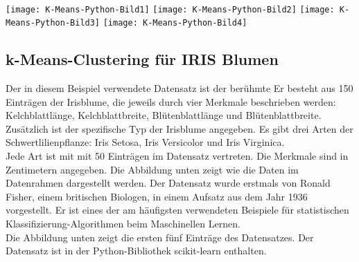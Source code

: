 \documentclass[12pt]{article}
\begin{document}
{\color{red}{***********************************************************************\\ 
Ab hier bis Ende der Section sind die Folien der Vorlesung ML  zu nutzen und diese sind in Latex umzusetzen...\\
************************************************************************}}\\[0.2cm]


\begin{center}
\hspace*{-1.0cm}   
\texttt{[image: K-Means-Python-Bild1]}
\hspace*{-1.0cm}   
\texttt{[image: K-Means-Python-Bild2]}
\hspace*{-1.0cm} 
\texttt{[image: K-Means-Python-Bild3]}
\hspace*{-1.0cm} 
\texttt{[image: K-Means-Python-Bild4]}
\end{center}

\subsection{k-Means-Clustering für IRIS Blumen}


Der in diesem Beispiel verwendete Datensatz ist der berühmte {\color{blue}{IRIS-Blumen Datensatz}}  Er besteht aus 150 Einträgen der Irisblume, die jeweils durch vier Merkmale beschrieben werden: Kelchblattlänge, Kelchblattbreite, Blütenblattlänge und
Blütenblattbreite. \\[0.2cm]
Zusätzlich ist der spezifische Typ der Irisblume angegeben. Es gibt drei Arten
der Schwertlilienpflanze: Iris Setosa, Iris Versicolor und Iris Virginica.\\
Jede Art ist mit mit 50 Einträgen im Datensatz vertreten. Die Merkmale sind in Zentimetern angegeben. Die Abbildung unten zeigt wie die Daten im Datenrahmen dargestellt werden. Der Datensatz wurde erstmals von Ronald Fisher, einem britischen Biologen, in einem Aufsatz aus dem Jahr 1936 vorgestellt. Er ist eines der am häufigsten verwendeten Beispiele für statistischen Klassifizierung-Algorithmen beim Maschinellen Lernen. \\
Die Abbildung unten zeigt die ersten fünf Einträge des Datensatzes. Der Datensatz ist in der Python-Bibliothek scikit-learn enthalten.\\ 
\end{document}
